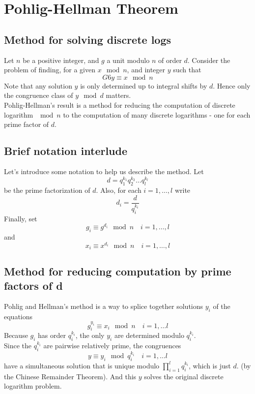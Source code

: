 \documentclass[10pt]{article}
\theoremstyle{definition}
\theoremstyle{remark}
\begin{document}
\section{Pohlig-Hellman Theorem}
\subsection{Method for solving discrete logs}
Let $n$ be a positive integer, and $g$ a unit modulo $n$ of order $d$. Consider the problem of finding, for a given $x \mod n$, and integer $y$ such that $$G6y \equiv x \mod n$$
Note that any solution $y$ is only determined up to integral shifts by $d$.  Hence only the congruence class of $y \mod d$ matters.\\
Pohlig-Hellman's result is a method for reducing the computation of discrete logarithm $\mod n$ to the computation of many discrete logarithms - one for each prime factor of $d$.  
\subsection{Brief notation interlude}
Let's introduce some notation to help us describe the method.  Let $$d = q_1^{k_1}q_2^{k_2}\ldots q_l^{k_l}$$
be the prime factorization of $d$.  Also, for each $i = 1,\ldots,l$ write $$d_i = \frac{d}{q_i^{k_i}}$$
Finally, set $$g_i \equiv g^{d_i} \mod n \quad i = 1,\ldots,l$$
and $$x_i \equiv x^{d_i} \mod n \quad i = 1,\ldots,l$$
\subsection{Method for reducing computation by prime factors of d}
Pohlig and Hellman's method is a way to splice together solutions $y_i$ of the equations
$$g_i^{y_i} \equiv x_i \mod n \quad i = 1,\ldots l$$
Because $g_i$ has order $q_i^{k_i}$, the only $y_i$ are determined modulo $q_i^{k_i}$.\\
Since the $q_i^{k_i}$ are pairwise relatively prime, the congruences
$$y \equiv y_i \mod q_i^{k_i} \quad i = 1,\ldots l$$
have a simultaneous solution that is unique modulo $\prod_{i=1}^{l}q_i^{k_i}$, which is just $d$.  (by the Chinese Remainder Theorem).  And this $y$ solves the original discrete logarithm problem.
\end{document}
